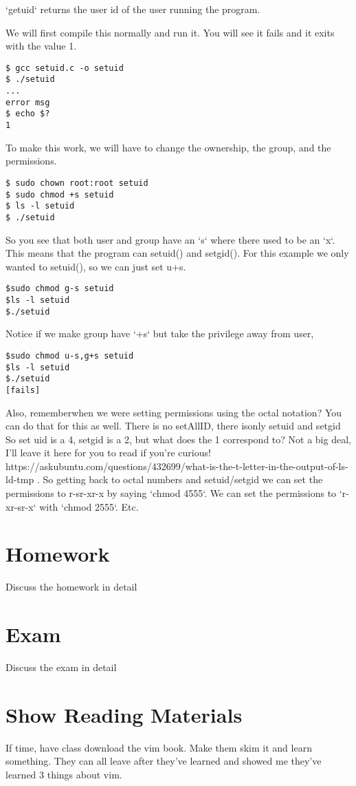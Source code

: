 \documentclass[12pt]{article}
\begin{document}
`getuid` returns the user id of the user running the program.


We will first compile this normally and run it. You will see it fails and it exits with the value 1.

\begin{lstlisting}
$ gcc setuid.c -o setuid
$ ./setuid
...
error msg
$ echo $?
1
\end{lstlisting}

To make this work, we will have to change the ownership, the group, and the permissions.

\begin{lstlisting}
$ sudo chown root:root setuid
$ sudo chmod +s setuid
$ ls -l setuid
$ ./setuid
\end{lstlisting}

So you see that both user and group have an `s` where there used to be an `x`. This means that the program can setuid() and setgid(). For this example we only wanted to setuid(), so we can just set u+s.

\begin{lstlisting}
$sudo chmod g-s setuid
$ls -l setuid
$./setuid
\end{lstlisting}

Notice if we make group have `+s` but take the privilege away from user, 

\begin{lstlisting}
$sudo chmod u-s,g+s setuid
$ls -l setuid
$./setuid
[fails]
\end{lstlisting}

Also, rememberwhen we were setting permissions using the octal notation? You can do that for this as well. There is no setAllID, there isonly setuid and setgid
So set uid is a 4, setgid is a 2, but what does the 1 correspond to? Not a big deal, I'll leave it here for you to read if you're curious! https://askubuntu.com/questions/432699/what-is-the-t-letter-in-the-output-of-ls-ld-tmp . So getting back to octal numbers and setuid/setgid we can set the permissions to r-sr-xr-x by saying `chmod 4555`. We can set the permissions to `r-xr-sr-x` with `chmod 2555`. Etc.

\section{Homework}
Discuss the homework in detail

\section{Exam}
Discuss the exam in detail

\section{Show Reading Materials}
If time, have class  download the vim book. Make them skim it and learn something. They can all leave after they've learned and showed me they've learned 3 things about vim.
\end{document}
